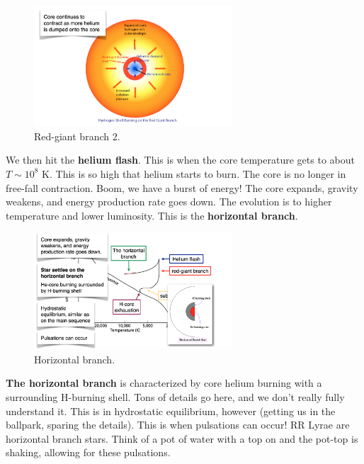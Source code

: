 \documentclass{article}
\begin{document}
\begin{figure}
    \centering
    \includegraphics[width=0.66\textwidth]{figs/Screen Shot 2021-09-15 at 9.07.30 AM.png}
    \caption{Red-giant branch 2.}
    \label{fig:red2}
\end{figure}

We then hit the \textbf{helium flash}. This is when the core temperature gets to about $T\sim 10^8$ K. This is so high that helium starts to burn. The core is no longer in free-fall contraction. Boom, we have a burst of energy! The core expands, gravity weakens, and energy production rate goes down. The evolution is to higher temperature and lower luminosity. This is the \textbf{horizontal branch}.

\begin{figure}
    \centering
    \includegraphics[width=0.66\textwidth]{figs/Screen Shot 2021-09-15 at 9.08.04 AM.png}
    \caption{Horizontal branch.}
    \label{fig:horizontal}
\end{figure}

\textbf{The horizontal branch} is characterized by core helium burning with a surrounding H-burning shell. Tons of details go here, and we don't really fully understand it. This is in hydrostatic equilibrium, however (getting us in the ballpark, sparing the details). This is when pulsations can occur! RR Lyrae are horizontal branch stars. Think of a pot of water with a top on and the pot-top is shaking, allowing for these pulsations. 
\end{document}
